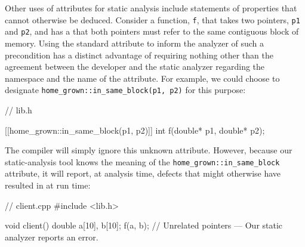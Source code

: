 Other uses of attributes for static analysis include statements of
properties that cannot otherwise be deduced. Consider a function, \lstinline!f!, that takes two pointers,
\lstinline!p1! and \lstinline!p2!, and has a  that both
pointers must refer to the same contiguous block of memory. Using the standard attribute to inform the analyzer of such a precondition has a distinct advantage of requiring nothing other than the agreement between the developer and the static analyzer regarding the namespace and the name of the attribute. For example, we could choose to designate \lstinline!home_grown::in_same_block(p1, p2)! for this purpose: 

\begin{emcppslisting}[language=C++]
// lib.h

[[home_grown::in_same_block(p1, p2)]]
int f(double* p1, double* p2);
\end{emcppslisting}
    
\noindent The compiler will simply ignore this unknown attribute. However, because our static-analysis tool knows the meaning of the \lstinline!home_grown::in_same_block! attribute, it will report, at analysis time, defects that might otherwise have resulted in  at run time:

\begin{emcppslisting}[language=C++]
// client.cpp
#include <lib.h>

void client()
{
    double a[10], b[10];
    f(a, b);  // Unrelated pointers --- Our static analyzer reports an error.
}
\end{emcppslisting}
    

